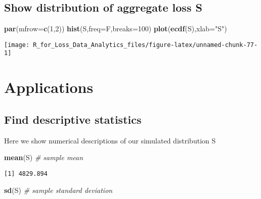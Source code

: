 \documentclass[]{book}
\newenvironment{Shaded}{\begin{snugshade}}{\end{snugshade}}
\newcommand{\KeywordTok}[1]{\textcolor[rgb]{0.13,0.29,0.53}{\textbf{#1}}}
\newcommand{\DataTypeTok}[1]{\textcolor[rgb]{0.13,0.29,0.53}{#1}}
\newcommand{\DecValTok}[1]{\textcolor[rgb]{0.00,0.00,0.81}{#1}}
\newcommand{\StringTok}[1]{\textcolor[rgb]{0.31,0.60,0.02}{#1}}
\newcommand{\CommentTok}[1]{\textcolor[rgb]{0.56,0.35,0.01}{\textit{#1}}}
\newcommand{\NormalTok}[1]{#1}
\theoremstyle{definition}
\theoremstyle{definition}
\theoremstyle{definition}
\theoremstyle{remark}
\begin{document}
\subsection{Show distribution of aggregate loss
S}\label{show-distribution-of-aggregate-loss-s}

\begin{Shaded}
\begin{Highlighting}[]
\KeywordTok{par}\NormalTok{(}\DataTypeTok{mfrow=}\KeywordTok{c}\NormalTok{(}\DecValTok{1}\NormalTok{,}\DecValTok{2}\NormalTok{))}
\KeywordTok{hist}\NormalTok{(S,}\DataTypeTok{freq=}\NormalTok{F,}\DataTypeTok{breaks=}\DecValTok{100}\NormalTok{)}
\KeywordTok{plot}\NormalTok{(}\KeywordTok{ecdf}\NormalTok{(S),}\DataTypeTok{xlab=}\StringTok{"S"}\NormalTok{)}
\end{Highlighting}
\end{Shaded}

\begin{center}\texttt{[image: R\_for\_Loss\_Data\_Analytics\_files/figure-latex/unnamed-chunk-77-1]} \end{center}

\section{Applications}\label{applications}

\subsection{Find descriptive
statistics}\label{find-descriptive-statistics}

Here we show numerical descriptions of our simulated distribution S

\begin{Shaded}
\begin{Highlighting}[]
\KeywordTok{mean}\NormalTok{(S)                             }\CommentTok{# sample mean}
\end{Highlighting}
\end{Shaded}

\begin{verbatim}
[1] 4829.894
\end{verbatim}

\begin{Shaded}
\begin{Highlighting}[]
\KeywordTok{sd}\NormalTok{(S)                               }\CommentTok{# sample standard deviation}
\end{Highlighting}
\end{Shaded}
\end{document}
